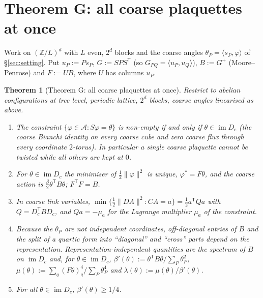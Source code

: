 \documentclass[11pt,a4paper]{article}
\newtheorem{theorem}{Theorem}[section]
\theoremstyle{definition}
\theoremstyle{remark}
\newcommand{\cA}{\mathcal{A}}
\newcommand{\im}{\operatorname{im}}
\begin{document}
\section{Theorem G: all coarse plaquettes at once}\label{sec:G}

Work on $(\mathbb{Z}/L)^d$ with $L$ even, $2^d$ blocks and the coarse angles $\theta_P=\langle s_P,\varphi\rangle$ of \S\ref{sec:setting}. Put $u_P:=Ps_P$, $G:=SPS^{\mathsf T}$ (so $G_{PQ}=\langle u_P,u_Q\rangle$), $B:=G^{+}$ (Moore--Penrose) and $F:=UB$, where $U$ has columns $u_P$.

\begin{theorem}[Theorem G: all coarse plaquettes at once]\label{thm:G}
Restrict to abelian configurations at tree level, periodic lattice, $2^d$ blocks, coarse angles linearised as above.
\begin{enumerate}[label=(\roman*)]
\item The constraint $\{\varphi\in\cA:S\varphi=\theta\}$ is non-empty if and only if $\theta\in\im D_c$ (the coarse Bianchi identity on every coarse cube and zero coarse flux through every coordinate $2$-torus). In particular a single coarse plaquette cannot be twisted while all others are kept at $0$.
\item For $\theta\in\im D_c$ the minimiser of $\frac12\|\varphi\|^2$ is unique, $\varphi^*=F\theta$, and the coarse action is $\frac\beta2\theta^{\mathsf T}B\theta$; $F^{\mathsf T}F=B$.
\item In coarse link variables, $\min\{\frac12\|DA\|^2:CA=a\}=\frac12a^{\mathsf T}Qa$ with $Q=D_c^{\mathsf T}BD_c$, and $Qa=-\mu_a$ for the Lagrange multiplier $\mu_a$ of the constraint.
\item Because the $\theta_P$ are not independent coordinates, off-diagonal entries of $B$ and the split of a quartic form into ``diagonal'' and ``cross'' parts depend on the representation. Representation-independent quantities are the spectrum of $B$ on $\im D_c$ and, for $\theta\in\im D_c$, $\beta'(\theta):=\theta^{\mathsf T}B\theta/\sum_P\theta_P^2$, $\mu(\theta):=\sum_q(F\theta)_q^4/\sum_P\theta_P^4$ and $\lambda(\theta):=\mu(\theta)/\beta'(\theta)$.
\item For all $\theta\in\im D_c$, $\beta'(\theta)\ge1/4$.
\end{enumerate}
\end{theorem}
\end{document}
